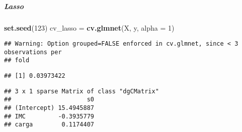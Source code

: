 \documentclass[]{article}
\newenvironment{Shaded}{\begin{snugshade}}{\end{snugshade}}
\newcommand{\DataTypeTok}[1]{\textcolor[rgb]{0.13,0.29,0.53}{#1}}
\newcommand{\DecValTok}[1]{\textcolor[rgb]{0.00,0.00,0.81}{#1}}
\newcommand{\KeywordTok}[1]{\textcolor[rgb]{0.13,0.29,0.53}{\textbf{#1}}}
\newcommand{\NormalTok}[1]{#1}
\newcommand{\OperatorTok}[1]{\textcolor[rgb]{0.81,0.36,0.00}{\textbf{#1}}}
\newcommand{\StringTok}[1]{\textcolor[rgb]{0.31,0.60,0.02}{#1}}
\let\oldsubparagraph\subparagraph
\renewcommand{\subparagraph}[1]{\oldsubparagraph{#1}\mbox{}}
\begin{document}
\hypertarget{lasso}{%
\subparagraph{Lasso}\label{lasso}}

\begin{Shaded}
\begin{Highlighting}[]
\KeywordTok{set.seed}\NormalTok{(}\DecValTok{123}\NormalTok{)}
\NormalTok{cv_lasso =}\StringTok{ }\KeywordTok{cv.glmnet}\NormalTok{(X, y, }\DataTypeTok{alpha =} \DecValTok{1}\NormalTok{)}
\end{Highlighting}
\end{Shaded}

\begin{verbatim}
## Warning: Option grouped=FALSE enforced in cv.glmnet, since < 3 observations per
## fold
\end{verbatim}

\begin{Shaded}
\end{Shaded}

\begin{verbatim}
## [1] 0.03973422
\end{verbatim}

\begin{Shaded}
\end{Shaded}

\begin{verbatim}
## 3 x 1 sparse Matrix of class "dgCMatrix"
##                     s0
## (Intercept) 15.4945887
## IMC         -0.3935779
## carga        0.1174407
\end{verbatim}

\begin{Shaded}
\end{Shaded}
\end{document}
